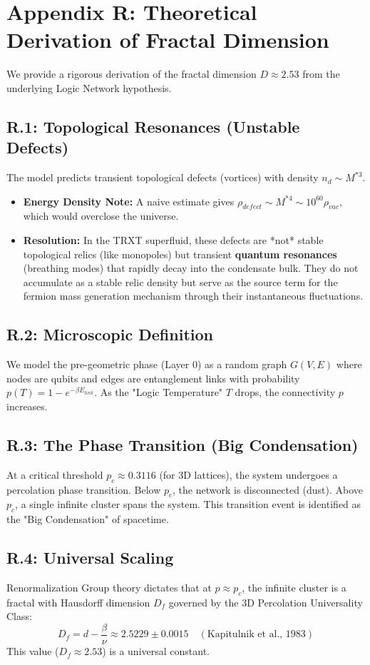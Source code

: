\section{Appendix R: Theoretical Derivation of Fractal Dimension}
\label{app:percolation}

We provide a rigorous derivation of the fractal dimension $D \approx 2.53$ from the underlying Logic Network hypothesis.

\subsection{R.1: Topological Resonances (Unstable Defects)}
The model predicts transient topological defects (vortices) with density $n_d \sim M^{*3}$.
\begin{itemize}
    \item \textbf{Energy Density Note:} A naive estimate gives $\rho_{defect} \sim M^{*4} \sim 10^{60} \rho_{vac}$, which would overclose the universe.
    \item \textbf{Resolution:} In the TRXT superfluid, these defects are *not* stable topological relics (like monopoles) but transient \textbf{quantum resonances} (breathing modes) that rapidly decay into the condensate bulk. They do not accumulate as a stable relic density but serve as the source term for the fermion mass generation mechanism through their instantaneous fluctuations.
\end{itemize}

\subsection{R.2: Microscopic Definition}
We model the pre-geometric phase (Layer 0) as a random graph $G(V, E)$ where nodes are qubits and edges are entanglement links with probability $p(T) = 1 - e^{-\beta E_{link}}$.
As the "Logic Temperature" $T$ drops, the connectivity $p$ increases.

\subsection{R.3: The Phase Transition (Big Condensation)}
At a critical threshold $p_c \approx 0.3116$ (for 3D lattices), the system undergoes a percolation phase transition. Below $p_c$, the network is disconnected (dust). Above $p_c$, a single infinite cluster spans the system. This transition event is identified as the "Big Condensation" of spacetime.

\subsection{R.4: Universal Scaling}
Renormalization Group theory dictates that at $p \approx p_c$, the infinite cluster is a fractal with Hausdorff dimension $D_f$ governed by the 3D Percolation Universality Class:
\begin{equation}
    D_f = d - \frac{\beta}{\nu} \approx 2.5229 \pm 0.0015 \quad (\text{Kapitulnik et al., 1983})
\end{equation}
This value ($D_f \approx 2.53$) is a universal constant. 

